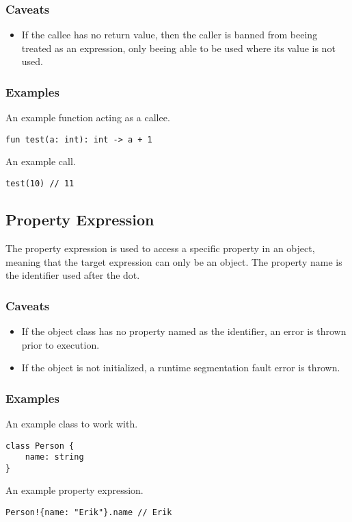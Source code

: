 \subsubsection{Caveats}

\begin{itemize}
    \item If the callee has no return value, then the caller is banned from beeing treated as an expression, only beeing
        able to be used where its value is not used.
\end{itemize}

\subsubsection{Examples}

An example function acting as a callee.
\begin{lstlisting}
fun test(a: int): int -> a + 1
\end{lstlisting}
An example call.
\begin{lstlisting}
test(10) // 11
\end{lstlisting}

\subsection{Property Expression}

The property expression is used to access a specific property in an object, meaning that the target expression can only be
an object. The property name is the identifier used after the dot.

\subsubsection{Caveats}

\begin{itemize}
    \item If the object class has no property named as the identifier, an error is thrown prior to execution.
    \item If the object is not initialized, a runtime segmentation fault error is thrown.
\end{itemize}

\subsubsection{Examples}

An example class to work with.
\begin{lstlisting}
class Person {
    name: string
}
\end{lstlisting}
An example property expression.
\begin{lstlisting}
Person!{name: "Erik"}.name // Erik
\end{lstlisting}

